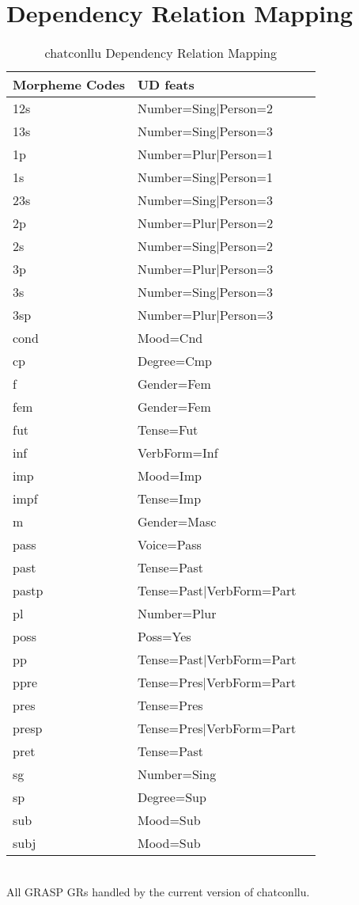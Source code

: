 \newpage
\section{Dependency Relation Mapping}
\begin{table}[h!]
\caption {chatconllu Dependency Relation Mapping} \label{tab:grmap}
\centering
\begin{tabularx}{\linewidth}{@{}lXl@{}}
\toprule
\textbf{Morpheme Codes} & \textbf{UD feats}\\ \midrule
	12s & Number=Sing|Person=2\\
	13s & Number=Sing|Person=3\\
	1p & Number=Plur|Person=1\\
	1s & Number=Sing|Person=1\\
	23s & Number=Sing|Person=3\\
	2p & Number=Plur|Person=2\\
	2s & Number=Sing|Person=2\\
	3p & Number=Plur|Person=3\\
	3s & Number=Sing|Person=3\\
	3sp & Number=Plur|Person=3\\
	cond & Mood=Cnd\\
	cp & Degree=Cmp\\
	f & Gender=Fem\\
	fem & Gender=Fem\\
	fut & Tense=Fut\\
	inf & VerbForm=Inf\\
	imp & Mood=Imp\\
	impf & Tense=Imp\\
	m & Gender=Masc\\
	pass & Voice=Pass\\
	past & Tense=Past\\
	pastp & Tense=Past|VerbForm=Part\\
	pl & Number=Plur\\
	poss & Poss=Yes\\
	pp & Tense=Past|VerbForm=Part\\
	ppre & Tense=Pres|VerbForm=Part\\
	pres & Tense=Pres\\
	presp & Tense=Pres|VerbForm=Part\\
	pret & Tense=Past\\
	sg & Number=Sing\\
	sp & Degree=Sup\\
	sub & Mood=Sub\\
	subj & Mood=Sub\\\bottomrule
\end{tabularx}\\
\vspace{0.5cm}
All GRASP GRs handled by the current version of chatconllu.\\
\end{table}
